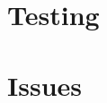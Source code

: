 \documentclass{sig-alternate-05-2015}
\begin{document}

\vfill\pagebreak

\section{Testing}

\section{Issues}


\end{document}
